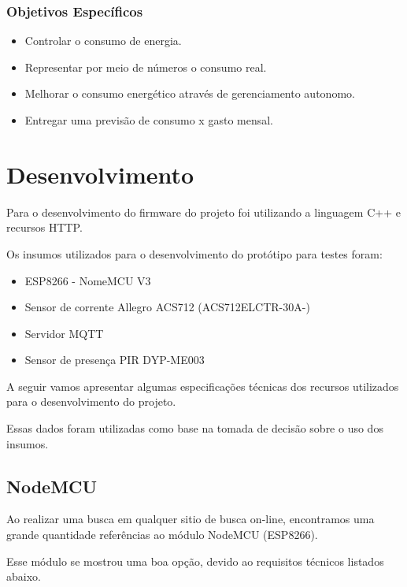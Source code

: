 \documentclass[openright]{normas-utf-tex} %
\begin{document}
\subsection{Objetivos Específicos}

\begin{itemize}
	\item Controlar o consumo de energia.
	\item Representar por meio de números o consumo real. 
	\item Melhorar o consumo energético através de gerenciamento autonomo.
	\item Entregar uma previsão de consumo x gasto mensal.
\end{itemize}


\chapter{Desenvolvimento}
\label{chap:desenv}

 
Para o desenvolvimento do firmware do projeto foi utilizando a linguagem C++   \cite{Altabooks} e recursos HTTP.

Os insumos utilizados para o desenvolvimento do protótipo para testes foram:

\begin{itemize}
       	\item ESP8266 - NomeMCU V3
        \item Sensor de corrente Allegro ACS712 (ACS712ELCTR-30A-)
        \item Servidor MQTT
        \item Sensor de presença PIR DYP-ME003
\end{itemize}

A seguir vamos apresentar algumas especificações técnicas dos recursos utilizados para o desenvolvimento do projeto.

Essas dados foram utilizadas como base na tomada de decisão sobre o uso dos insumos. 

\section{NodeMCU}
Ao realizar uma busca em qualquer sitio de busca on-line, encontramos uma grande quantidade referências ao módulo NodeMCU (ESP8266).

Esse módulo se mostrou uma boa opção, devido ao requisitos técnicos listados abaixo.
\end{document}
